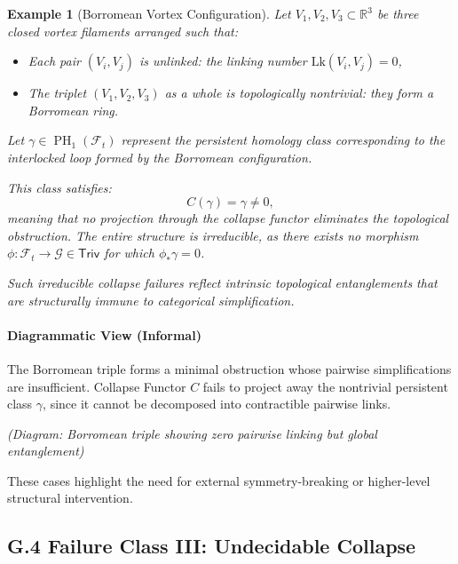 \documentclass[11pt]{article}
\newtheorem{example}[theorem]{Example}
\DeclareMathOperator{\PH}{PH}
\begin{document}
\begin{example}[Borromean Vortex Configuration]
Let \( V_1, V_2, V_3 \subset \mathbb{R}^3 \) be three closed vortex filaments arranged such that:

\begin{itemize}
  \item Each pair \( (V_i, V_j) \) is unlinked: the linking number \( \mathrm{Lk}(V_i, V_j) = 0 \),
  \item The triplet \( (V_1, V_2, V_3) \) as a whole is topologically nontrivial: they form a Borromean ring.
\end{itemize}

Let \( \gamma \in \PH_1(\mathcal{F}_t) \) represent the persistent homology class corresponding to the interlocked loop formed by the Borromean configuration.

This class satisfies:
\[
C(\gamma) = \gamma \neq 0,
\]
meaning that no projection through the collapse functor eliminates the topological obstruction. The entire structure is irreducible, as there exists no morphism \( \phi : \mathcal{F}_t \to \mathcal{G} \in \mathsf{Triv} \) for which \( \phi_* \gamma = 0 \).

Such irreducible collapse failures reflect intrinsic topological entanglements that are structurally immune to categorical simplification.
\end{example}

\paragraph{Diagrammatic View (Informal)}
The Borromean triple forms a minimal obstruction whose pairwise simplifications are insufficient. Collapse Functor \( C \) fails to project away the nontrivial persistent class \( \gamma \), since it cannot be decomposed into contractible pairwise links.

\begin{center}
\textit{(Diagram: Borromean triple showing zero pairwise linking but global entanglement)}
\end{center}

These cases highlight the need for external symmetry-breaking or higher-level structural intervention.

\subsection{G.4 Failure Class III: Undecidable Collapse}
\end{document}
